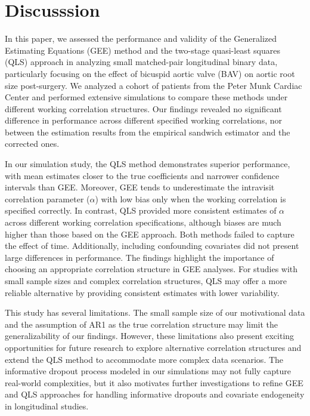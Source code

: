 \documentclass[
]{aft}
\begin{document}
\section{Discusssion}\label{discusssion}

In this paper, we assessed the performance and validity of the
Generalized Estimating Equations (GEE) method and the two-stage
quasi-least squares (QLS) approach in analyzing small matched-pair
longitudinal binary data, particularly focusing on the effect of
bicuspid aortic valve (BAV) on aortic root size post-surgery. We
analyzed a cohort of patients from the Peter Munk Cardiac Center and
performed extensive simulations to compare these methods under different
working correlation structures. Our findings revealed no significant
difference in performance across different specified working
correlations, nor between the estimation results from the empirical
sandwich estimator and the corrected ones.

In our simulation study, the QLS method demonstrates superior
performance, with mean estimates closer to the true coefficients and
narrower confidence intervals than GEE. Moreover, GEE tends to
underestimate the intravisit correlation parameter (\(\alpha\)) with low
bias only when the working correlation is specified correctly. In
contrast, QLS provided more consistent estimates of \(\alpha\) across
different working correlation specifications, although biases are much
higher than those based on the GEE approach. Both methods failed to
capture the effect of time. Additionally, including confounding
covariates did not present large differences in performance. The
findings highlight the importance of choosing an appropriate correlation
structure in GEE analyses. For studies with small sample sizes and
complex correlation structures, QLS may offer a more reliable
alternative by providing consistent estimates with lower variability.

This study has several limitations. The small sample size of our
motivational data and the assumption of AR1 as the true correlation
structure may limit the generalizability of our findings. However, these
limitations also present exciting opportunities for future research to
explore alternative correlation structures and extend the QLS method to
accommodate more complex data scenarios. The informative dropout process
modeled in our simulations may not fully capture real-world
complexities, but it also motivates further investigations to refine GEE
and QLS approaches for handling informative dropouts and covariate
endogeneity in longitudinal studies.
\end{document}
